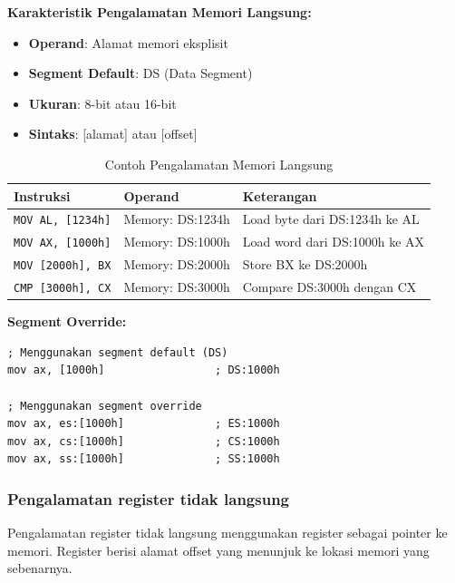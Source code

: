 \documentclass[../main.tex]{subfiles}
\begin{document}
\textbf{Karakteristik Pengalamatan Memori Langsung:}
\begin{itemize}
    \item \textbf{Operand}: Alamat memori eksplisit
    \item \textbf{Segment Default}: DS (Data Segment)
    \item \textbf{Ukuran}: 8-bit atau 16-bit
    \item \textbf{Sintaks}: [alamat] atau [offset]
\end{itemize}

\begin{table}[H]
    \centering
    \caption{Contoh Pengalamatan Memori Langsung}
    \begin{tabular}{|p{3.5cm}|p{4.0cm}|p{6.5cm}|}
        \hline
        \textbf{Instruksi} & \textbf{Operand} & \textbf{Keterangan} \\
        \hline
        \texttt{MOV AL, [1234h]} & Memory: DS:1234h & Load byte dari DS:1234h ke AL \\
        \hline
        \texttt{MOV AX, [1000h]} & Memory: DS:1000h & Load word dari DS:1000h ke AX \\
        \hline
        \texttt{MOV [2000h], BX} & Memory: DS:2000h & Store BX ke DS:2000h \\
        \hline
        \texttt{CMP [3000h], CX} & Memory: DS:3000h & Compare DS:3000h dengan CX \\
        \hline
    \end{tabular}
    \label{tab:direct-memory-addressing-examples}
\end{table}

\textbf{Segment Override:}
\begin{lstlisting}[language={[x86masm]Assembler}, caption=Segment Override dalam Pengalamatan Memori, label=lst:segment-override]
; Menggunakan segment default (DS)
mov ax, [1000h]                 ; DS:1000h

; Menggunakan segment override
mov ax, es:[1000h]              ; ES:1000h
mov ax, cs:[1000h]              ; CS:1000h
mov ax, ss:[1000h]              ; SS:1000h
\end{lstlisting}

            \subsubsection{Pengalamatan register tidak langsung}
Pengalamatan register tidak langsung menggunakan register sebagai pointer ke memori. Register berisi alamat offset yang menunjuk ke lokasi memori yang sebenarnya.
\end{document}
